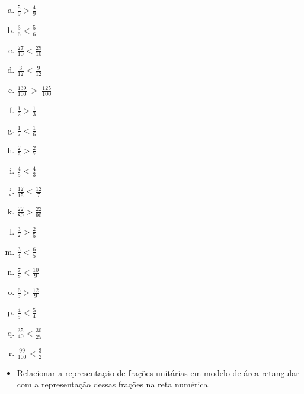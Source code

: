 \begin{solucao}{}{}

  \begin{multicols}{3}
\begin{enumerate}[a)]
 \item $\frac{5}{9} > \frac{4}{9}$
 \item $\frac{3}{6} < \frac{5}{6}$
\item   $\frac{27}{10} < \frac{29}{10}$
\item  $\frac{3}{12} < \frac{9}{12}$
\item $\frac{139}{100}~>~\frac{125}{100}$
  \columnbreak
  
\item   $\frac{1}{2} > \frac{1}{3}$
\item  $\frac{1}{7} < \frac{1}{6}$
\item   $\frac{2}{5} > \frac{2}{7}$
\item   $\frac{4}{5} < \frac{4}{3}$
\item   $\frac{12}{15} < \frac{12}{7}$
\item   $\frac{22}{80} > \frac{22}{90}$
  \columnbreak
  
\item   $\frac{3}{2} > \frac{2}{5}$
\item   $\frac{3}{4} < \frac{6}{5}$
\item   $\frac{7}{8} < \frac{10}{9}$
\item   $\frac{6}{5} > \frac{12}{9}$
\item  $\frac{4}{5}< \frac{5}{4}$
\item  $\frac{35}{40}< \frac{30}{25}$
\item  $\frac{99}{100}<\frac{3}{2}$
\end{enumerate}
\end{multicols}

\end{solucao}


\begin{objetivos}[label=chap3-ativ17]{}{}
\begin{itemize} %
    \item       Relacionar a representação de frações unitárias em modelo de área retangular com a representação dessas frações na reta numérica.
\end{itemize} %
\end{objetivos}

